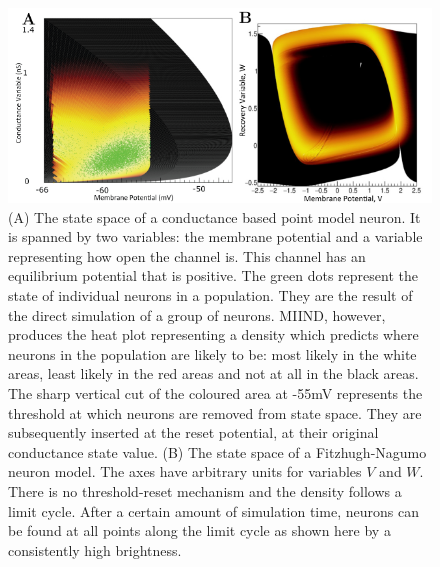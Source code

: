\documentclass[utf8]{frontiersSCNS} %
\begin{document}
\begin{figure}[htb!]
  \centering
    \includegraphics[width=\linewidth]{images/cloud_full_figure.pdf}
  \caption{(A) The state space of a conductance based point model neuron. It is spanned by two variables: the membrane potential and a variable representing how open the channel is. This channel has an equilibrium potential that is positive. The green dots represent the state of individual neurons in a population. They are the result of the direct simulation of a group of neurons. MIIND, however, produces the heat plot representing a density which predicts where neurons in the population are likely to be: most likely in the white areas, least likely in  the red areas and not at all in the black areas. The sharp vertical cut of the coloured area at -55mV represents the threshold at which neurons are removed from state space. They are subsequently inserted at the reset potential, at their original conductance state value. (B) The state space of a Fitzhugh-Nagumo neuron model. The axes have arbitrary units for variables $V$ and $W$. There is no threshold-reset mechanism and the density follows a limit cycle. After a certain amount of simulation time, neurons can be found at all points along the limit cycle as shown here by a consistently high brightness.}
  \label{fig-cloud}
\end{figure}
\end{document}
